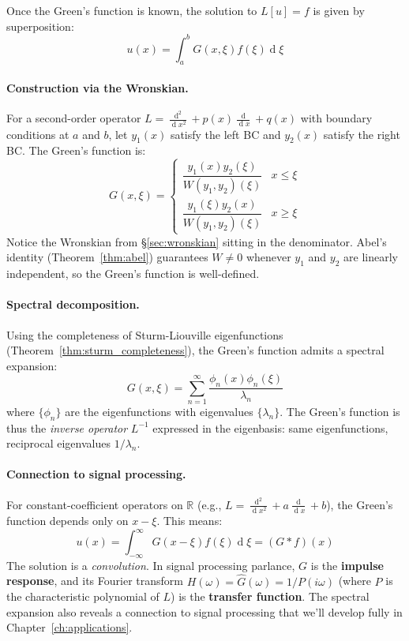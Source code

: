 \documentclass[12pt,a4paper]{report}
\DeclareMathOperator{\deriv}{d}
\theoremstyle{thms}
\theoremstyle{defns}
\begin{document}
Once the Green's function is known, the solution to $L[u] = f$ is given by superposition:
\begin{equation}
    u(x) = \int_a^b G(x, \xi) f(\xi) \deriv{\xi}
\end{equation}

\paragraph{Construction via the Wronskian.} For a second-order operator $L = \frac{\deriv^2}{\deriv x^2} + p(x)\frac{\deriv}{\deriv x} + q(x)$ with boundary conditions at $a$ and $b$, let $y_1(x)$ satisfy the left BC and $y_2(x)$ satisfy the right BC. The Green's function is:
\begin{equation}
    G(x, \xi) = \begin{cases}
        \dfrac{y_1(x)y_2(\xi)}{W(y_1, y_2)(\xi)} & x \leq \xi \\[8pt]
        \dfrac{y_1(\xi)y_2(x)}{W(y_1, y_2)(\xi)} & x \geq \xi
    \end{cases}
    \label{eq:greens_wronskian}
\end{equation}
Notice the Wronskian from \S\ref{sec:wronskian} sitting in the denominator. Abel's identity (Theorem~\ref{thm:abel}) guarantees $W \neq 0$ whenever $y_1$ and $y_2$ are linearly independent, so the Green's function is well-defined.

\paragraph{Spectral decomposition.} Using the completeness of Sturm-Liouville eigenfunctions (Theorem~\ref{thm:sturm_completeness}), the Green's function admits a spectral expansion:
\begin{equation}
    G(x, \xi) = \sum_{n=1}^{\infty} \dfrac{\phi_n(x)\phi_n(\xi)}{\lambda_n}
    \label{eq:greens_spectral}
\end{equation}
where $\{\phi_n\}$ are the eigenfunctions with eigenvalues $\{\lambda_n\}$. The Green's function is thus the \textit{inverse operator} $L^{-1}$ expressed in the eigenbasis: same eigenfunctions, reciprocal eigenvalues $1/\lambda_n$.

\paragraph{Connection to signal processing.} For constant-coefficient operators on $\mathbb{R}$ (e.g., $L = \frac{\deriv^2}{\deriv x^2} + a\frac{\deriv}{\deriv x} + b$), the Green's function depends only on $x - \xi$. This means:
\begin{equation}
    u(x) = \int_{-\infty}^{\infty} G(x - \xi)f(\xi)\deriv{\xi} = (G * f)(x)
\end{equation}
The solution is a \textit{convolution}. In signal processing parlance, $G$ is the \textbf{impulse response}, and its Fourier transform $H(\omega) = \hat{G}(\omega) = 1/P(i\omega)$ (where $P$ is the characteristic polynomial of $L$) is the \textbf{transfer function}. The spectral expansion also reveals a connection to signal processing that we'll develop fully in Chapter~\ref{ch:applications}.
\end{document}
